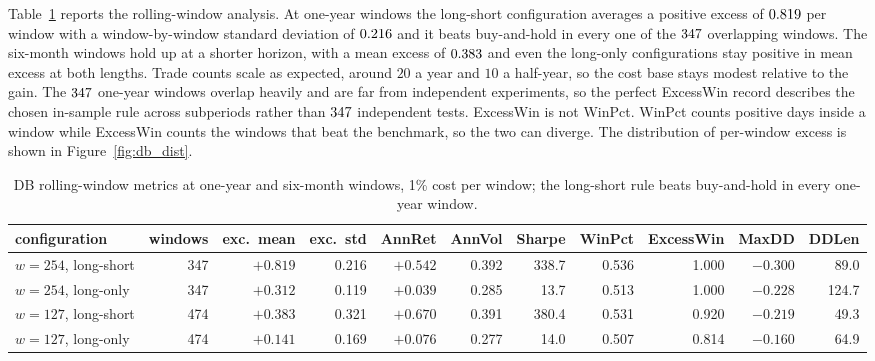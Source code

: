 \documentclass[12pt,a4paper]{article}
\begin{document}
Table~\ref{tab:db_rolling} reports the rolling-window analysis. At one-year
windows the long-short configuration averages a positive excess of
$0.819$ per window with a window-by-window standard deviation of
$0.216$ and it beats
buy-and-hold in every one of the $347$ overlapping windows. The six-month
windows hold up at a shorter horizon, with a mean excess of
$0.383$ and even the long-only configurations stay positive in
mean excess at
both lengths. Trade counts scale as expected, around $20$ a year and $10$ a
half-year, so the cost base stays modest relative to the gain. The
$347$ one-year windows overlap heavily and are far from independent
experiments, so the perfect ExcessWin record describes the chosen in-sample rule
across subperiods rather than $347$ independent tests. ExcessWin is not
WinPct. WinPct counts positive days inside a window while ExcessWin counts the
windows that beat the benchmark, so the two can diverge.
The distribution of per-window excess is shown in Figure~\ref{fig:db_dist}.

\begin{table}[ht]
\centering
\scriptsize
\setlength{\tabcolsep}{3pt}
\begin{tabular}{lrrrrrrrrrr}
\toprule
configuration & windows & exc.\ mean & exc.\ std & AnnRet & AnnVol & Sharpe & WinPct & ExcessWin & MaxDD & DDLen \\
\midrule
$w{=}254$, long-short & 347 & $+0.819$ & 0.216 & $+0.542$ & 0.392 & 338.7 & 0.536 & 1.000 & $-0.300$ & 89.0 \\
$w{=}254$, long-only  & 347 & $+0.312$ & 0.119 & $+0.039$ & 0.285 & 13.7 & 0.513 & 1.000 & $-0.228$ & 124.7 \\
$w{=}127$, long-short & 474 & $+0.383$ & 0.321 & $+0.670$ & 0.391 & 380.4 & 0.531 & 0.920 & $-0.219$ & 49.3 \\
$w{=}127$, long-only  & 474 & $+0.141$ & 0.169 & $+0.076$ & 0.277 & 14.0 & 0.507 & 0.814 & $-0.160$ & 64.9 \\
\bottomrule
\end{tabular}
\caption{DB rolling-window metrics at one-year and six-month windows, 1\% cost
per window; the long-short rule beats buy-and-hold in every one-year window.}
\label{tab:db_rolling}
\end{table}

\clearpage
\end{document}

